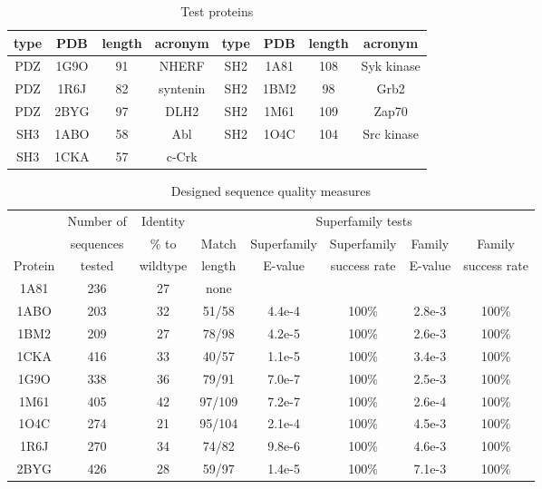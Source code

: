 \begin{table}[!htbp]                            
\caption{Test proteins}
\label{tab:proteins}                      
\begin{center}
\begin{tabular}{cccccccc} \hline \hline  
type & PDB  & length & acronym  & type & PDB  & length & acronym \\ \hline
PDZ  & 1G9O &  91    & NHERF    & SH2  & 1A81 & 108    & Syk kinase \\ 
PDZ  & 1R6J &  82    & syntenin & SH2  & 1BM2 &  98    & Grb2       \\
PDZ  & 2BYG &  97    & DLH2     & SH2  & 1M61 & 109    & Zap70      \\
SH3  & 1ABO &  58    & Abl      & SH2  & 1O4C & 104    & Src kinase \\
SH3  & 1CKA &  57    & c-Crk    &      &      &        &     \\ \hline
\end{tabular}
\end{center}
\end{table}


\begin{table}[!htbp]                            
\caption{Designed sequence quality measures}
\small
\label{tab:quality}                      
\begin{center}
\begin{tabular}{cccccccc} \hline \hline  
        & Number of & Identity & \multicolumn{5}{c}{\hrulefill Superfamily tests \hrulefill}   \\
        & sequences & \% to    & Match & Superfamily & Superfamily  & Family  & Family        \\
Protein & tested    & wildtype & length & E-value     & success rate & E-value & success rate  \\ \hline
1A81    & 236       & 27       & none   &             &              &         &               \\
1ABO    & 203       & 32       & 51/58  & 4.4e-4      & 100\%        & 2.8e-3  & 100\%         \\
1BM2    & 209       & 27       & 78/98  & 4.2e-5      & 100\%        & 2.6e-3  & 100\%         \\
1CKA    & 416       & 33       & 40/57  & 1.1e-5      & 100\%        & 3.4e-3  & 100\%         \\
1G9O    & 338       & 36       & 79/91  & 7.0e-7      & 100\%        & 2.5e-3  & 100\%         \\
1M61    & 405       & 42       & 97/109 & 7.2e-7      & 100\%        & 2.6e-4  & 100\%         \\
1O4C    & 274       & 21       & 95/104 & 2.1e-4      & 100\%        & 4.5e-3  & 100\%         \\
1R6J    & 270       & 34       & 74/82  & 9.8e-6      & 100\%        & 4.6e-3  & 100\%         \\
2BYG    & 426       & 28       & 59/97  & 1.4e-5      & 100\%        & 7.1e-3  & 100\%         \\ \hline
\end{tabular}
\end{center}
\end{table}


